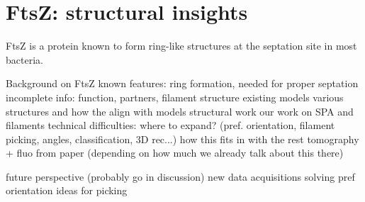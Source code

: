 \chapter{FtsZ: structural insights}

FtsZ is a protein known to form ring-like structures at the septation site in most bacteria.


\begin{outline}
\1 Background on FtsZ
    \2 known features: ring formation, needed for proper septation
    \2 incomplete info: function, partners, filament structure
    \2 existing models
    \2 \cite{lutkenhausBacterialCytokinesisRing2012,szwedziakArchitectureRingFormed2014,fujitaStructuresFtsZSingle2023,sextonSuperresolutionConfocalCryoCLEM2022,liStructureFtsZFilaments2007}
    \2 various structures and how the align with models
\1 structural work
    \2 our work on SPA and filaments
        \3 technical difficulties: where to expand? (pref. orientation, filament picking, angles, classification, 3D rec...)
    \2 how this fits in with the rest
    \2 tomography + fluo from paper (depending on how much we already talk about this there)

\1 future perspective (probably go in discussion)
    \2 new data acquisitions
    \2 solving pref orientation
    \2 ideas for picking
\end{outline}
